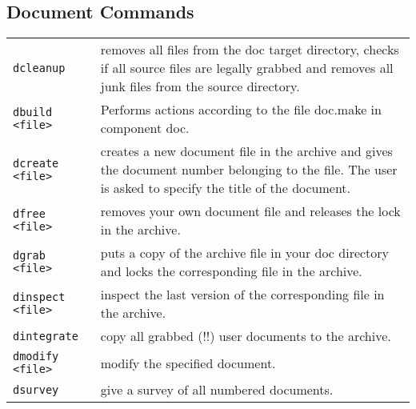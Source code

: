 \subsection{Document Commands}
\begin{tabular}{l p{7.7cm}}
\verb+dcleanup+                    & removes all files from the doc target directory,
                                  checks if all source files are legally grabbed
                                  and removes all junk files from the source
                                  directory. \\   
\verb+dbuild <file>+                  & Performs actions according to the file
                                     doc.make in component doc.\\
\verb+dcreate <file>+                  & creates a new document file in the archive
                                  and gives the document number belonging to
                                  the file. The user is asked
                                  to specify the title of the document.\\
\verb+dfree <file>+                    & removes your own document file and releases
                                  the lock in the archive.\\
\verb+dgrab <file>+                    & puts a copy of the archive file in your
                                  doc directory and locks the corresponding
                                  file in the archive.\\
\verb+dinspect <file>+                 & inspect the last version of the corresponding
                                  file in the archive.\\
\verb+dintegrate+                      & copy all grabbed (!!) user documents to the
                                  archive.\\
\verb+dmodify <file>+                  & modify the specified document.\\
\verb+dsurvey+                         & give a survey of all numbered documents.\\
\end{tabular}


